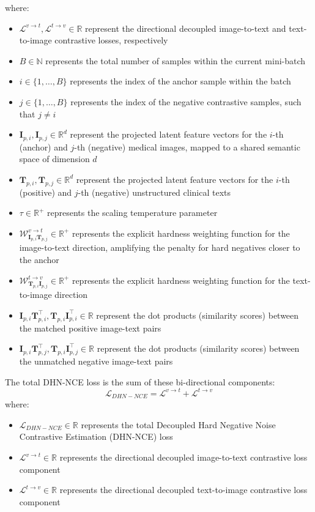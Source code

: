 where:
\begin{itemize}
\item $\mathcal{L}^{v \rightarrow t}, \mathcal{L}^{t \rightarrow v} \in \mathbb{R}$ represent the directional decoupled image-to-text and text-to-image contrastive losses, respectively
\item $B \in \mathbb{N}$ represents the total number of samples within the current mini-batch
\item $i \in \{1, \dots, B\}$ represents the index of the anchor sample within the batch
\item $j \in \{1, \dots, B\}$ represents the index of the negative contrastive samples, such that $j \neq i$
\item $\mathbf{I}_{p,i}, \mathbf{I}_{p,j} \in \mathbb{R}^{d}$ represent the projected latent feature vectors for the $i$-th (anchor) and $j$-th (negative) medical images, mapped to a shared semantic space of dimension $d$
\item $\mathbf{T}_{p,i}, \mathbf{T}_{p,j} \in \mathbb{R}^{d}$ represent the projected latent feature vectors for the $i$-th (positive) and $j$-th (negative) unstructured clinical texts
\item $\tau \in \mathbb{R}^+$ represents the scaling temperature parameter
\item $\mathcal{W}_{\mathbf{I}_{p,i}\mathbf{T}_{p,j}}^{v \rightarrow t} \in \mathbb{R}^+$ represents the explicit hardness weighting function for the image-to-text direction, amplifying the penalty for hard negatives closer to the anchor
\item $\mathcal{W}_{\mathbf{T}_{p,i}\mathbf{I}_{p,j}}^{t \rightarrow v} \in \mathbb{R}^+$ represents the explicit hardness weighting function for the text-to-image direction
\item $\mathbf{I}_{p,i}\mathbf{T}_{p,i}^\top, \mathbf{T}_{p,i}\mathbf{I}_{p,i}^\top \in \mathbb{R}$ represent the dot products (similarity scores) between the matched positive image-text pairs
\item $\mathbf{I}_{p,i}\mathbf{T}_{p,j}^\top, \mathbf{T}_{p,i}\mathbf{I}_{p,j}^\top \in \mathbb{R}$ represent the dot products (similarity scores) between the unmatched negative image-text pairs
\end{itemize}

The total DHN-NCE loss is the sum of these bi-directional components:
\begin{equation}
\mathcal{L}_{DHN-NCE} = \mathcal{L}^{v \rightarrow t} + \mathcal{L}^{t \rightarrow v}
\end{equation}
where:
\begin{itemize}
\item $\mathcal{L}_{DHN-NCE} \in \mathbb{R}$ represents the total Decoupled Hard Negative Noise Contrastive Estimation (DHN-NCE) loss
\item $\mathcal{L}^{v \rightarrow t} \in \mathbb{R}$ represents the directional decoupled image-to-text contrastive loss component
\item $\mathcal{L}^{t \rightarrow v} \in \mathbb{R}$ represents the directional decoupled text-to-image contrastive loss component
\end{itemize}

